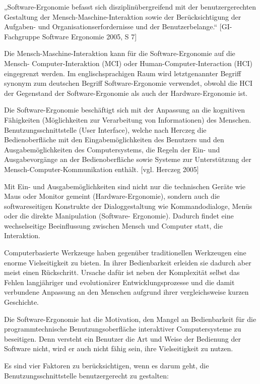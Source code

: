 \documentclass[a4paper, 12pt, twoside, BCOR=20mm, DIV=calc, abstracton, parskip=half*, toc=bibliography, toc=listof, headsepline, footsepline, headings=small, numbers=enddot]{scrreprt}
\begin{document}
	„Software-Ergonomie befasst sich disziplinübergreifend mit der benutzergerechten Gestaltung der Mensch-Maschine-Interaktion sowie der Berücksichtigung der Aufgaben- und Organisationserfordernisse und der Benutzerbelange.“ [GI-Fachgruppe Software Ergonomie 2005, S 7]
	
	Die Mensch-Maschine-Interaktion kann für die Software-Ergonomie auf die Mensch- Computer-Interaktion (MCI) oder Human-Computer-Interaction (HCI) eingegrenzt werden. Im englischsprachigen Raum wird letztgenannter Begriff synonym zum deutschen Begriff Software-Ergonomie verwendet, obwohl die HCI der Gegenstand der Software-Ergonomie als auch der Hardware-Ergonomie ist.
	
	Die Software-Ergonomie beschäftigt sich mit der Anpassung an die kognitiven Fähigkeiten (Möglichkeiten zur Verarbeitung von Informationen) des Menschen. Benutzungsschnittstelle (User Interface), welche nach Herczeg die Bedienoberfläche mit den Eingabemöglichkeiten des Benutzers und den Ausgabemöglichkeiten des Computersystems, die Regeln der Ein- und Ausgabevorgänge an der Bedienoberfläche sowie  Systeme zur Unterstützung der Mensch-Computer-Kommunikation enthält. [vgl. Herczeg 2005]
	
	Mit Ein- und Ausgabemöglichkeiten sind nicht nur die technischen Geräte wie Maus oder Monitor gemeint (Hardware-Ergonomie), sondern auch die softwareseitigen Konstrukte der Dialoggestaltung wie Kommandodialoge, Menüs oder die direkte Manipulation (Software- Ergonomie). Dadurch findet eine wechselseitige Beeinflussung zwischen Mensch und Computer statt, die Interaktion.
	
	Computerbasierte Werkzeuge haben gegenüber traditionellen Werkzeugen eine enorme Vielseitigkeit zu bieten. In ihrer Bedienbarkeit erleiden sie dadurch aber meist einen Rückschritt. Ursache dafür ist neben der Komplexität selbst das Fehlen langjähriger und evolutionärer Entwicklungsprozesse und die damit verbundene Anpassung an den Menschen aufgrund ihrer vergleichsweise kurzen Geschichte.
	
	Die Software-Ergonomie hat die Motivation, den Mangel an Bedienbarkeit für die programmtechnische Benutzungsoberfläche interaktiver Computersysteme zu beseitigen. Denn versteht ein Benutzer die Art und Weise der Bedienung der Software nicht, wird er auch nicht fähig sein, ihre Vielseitigkeit zu nutzen.
	
	Es sind vier Faktoren zu berücksichtigen, wenn es darum geht, die Benutzungsschnittstelle benutzergerecht zu gestalten:
	
\end{document}
